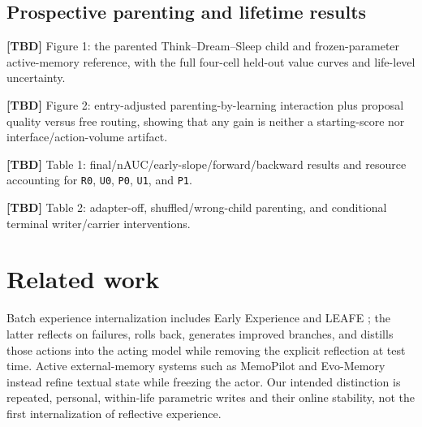 \documentclass{article}
\newcommand{\tbd}{\textbf{[TBD]}}
\begin{document}
\subsection{Prospective parenting and lifetime results}

\tbd{} Figure 1: the parented Think--Dream--Sleep child and frozen-parameter
active-memory reference,
with the full four-cell held-out value curves and life-level uncertainty.

\tbd{} Figure 2: entry-adjusted parenting-by-learning interaction plus
proposal quality versus free routing, showing that any gain is neither a
starting-score nor interface/action-volume artifact.

\tbd{} Table 1: final/nAUC/early-slope/forward/backward results and resource
accounting for \texttt{R0}, \texttt{U0}, \texttt{P0}, \texttt{U1}, and
\texttt{P1}.

\tbd{} Table 2: adapter-off, shuffled/wrong-child parenting, and conditional
terminal writer/carrier interventions.

\section{Related work}

Batch experience internalization includes Early Experience
\citep{zhang2025earlyexperience} and LEAFE \citep{ge2026leafe}; the
latter reflects on failures, rolls back, generates improved branches, and
distills those actions into the acting model while removing the explicit
reflection at test time. Active external-memory systems such as MemoPilot
\citep{cai2026memopilot} and Evo-Memory \citep{wei2025evomemory} instead
refine textual state while freezing the actor. Our intended
distinction is repeated, personal, within-life parametric writes and their
online stability, not the first internalization of reflective experience.
\end{document}
